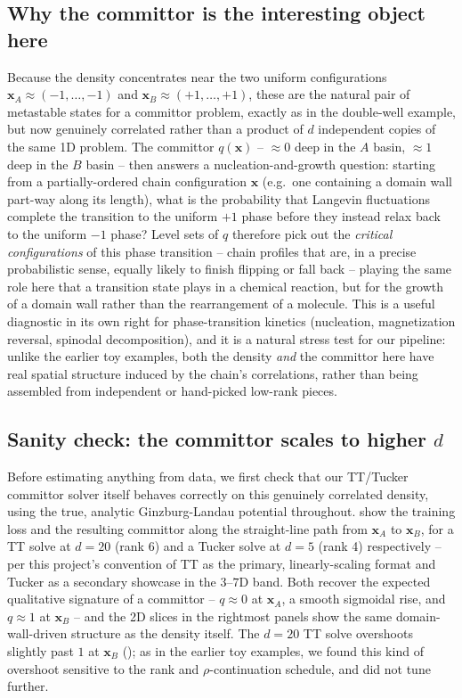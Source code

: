 \documentclass[11pt]{amsart}
\begin{document}
\subsection{Why the committor is the interesting object here}
Because the density concentrates near the two uniform configurations $\boldsymbol{x}_A\approx(-1,\ldots,-1)$ and $\boldsymbol{x}_B\approx(+1,\ldots,+1)$, these are the natural pair of metastable states for a committor problem, exactly as in the double-well example, but now genuinely correlated rather than a product of $d$ independent copies of the same 1D problem. The committor $q(\boldsymbol{x})$ -- $\approx 0$ deep in the $A$ basin, $\approx 1$ deep in the $B$ basin -- then answers a nucleation-and-growth question: starting from a partially-ordered chain configuration $\boldsymbol{x}$ (e.g.\ one containing a domain wall part-way along its length), what is the probability that Langevin fluctuations complete the transition to the uniform $+1$ phase before they instead relax back to the uniform $-1$ phase? Level sets of $q$ therefore pick out the \emph{critical configurations} of this phase transition -- chain profiles that are, in a precise probabilistic sense, equally likely to finish flipping or fall back -- playing the same role here that a transition state plays in a chemical reaction, but for the growth of a domain wall rather than the rearrangement of a molecule. This is a useful diagnostic in its own right for phase-transition kinetics (nucleation, magnetization reversal, spinodal decomposition), and it is a natural stress test for our pipeline: unlike the earlier toy examples, both the density \emph{and} the committor here have real spatial structure induced by the chain's correlations, rather than being assembled from independent or hand-picked low-rank pieces.

\subsection{Sanity check: the committor scales to higher $d$}
Before estimating anything from data, we first check that our TT/Tucker committor solver itself behaves correctly on this genuinely correlated density, using the true, analytic Ginzburg-Landau potential throughout.  show the training loss and the resulting committor along the straight-line path from $\boldsymbol{x}_A$ to $\boldsymbol{x}_B$, for a TT solve at $d=20$ (rank 6) and a Tucker solve at $d=5$ (rank 4) respectively -- per this project's convention of TT as the primary, linearly-scaling format and Tucker as a secondary showcase in the $3$--$7$D band. Both recover the expected qualitative signature of a committor -- $q\approx0$ at $\boldsymbol{x}_A$, a smooth sigmoidal rise, and $q\approx1$ at $\boldsymbol{x}_B$ -- and the 2D slices in the rightmost panels show the same domain-wall-driven structure as the density itself. The $d=20$ TT solve overshoots slightly past $1$ at $\boldsymbol{x}_B$ (); as in the earlier toy examples, we found this kind of overshoot sensitive to the rank and $\rho$-continuation schedule, and did not tune further.
\end{document}
